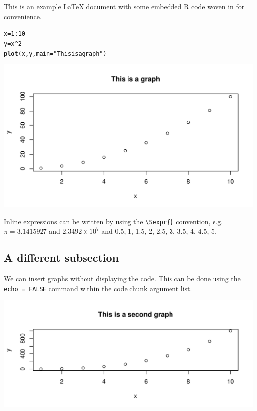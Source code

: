\documentclass{article}\usepackage[]{graphicx}\usepackage[]{xcolor}
\makeatletter
\def\maxwidth{ %
  \ifdim\Gin@nat@width>\linewidth
    \linewidth
  \else
    \Gin@nat@width
  \fi
}
\newcommand{\hlnum}[1]{\textcolor[rgb]{0.686,0.059,0.569}{#1}}%
\newcommand{\hlstr}[1]{\textcolor[rgb]{0.192,0.494,0.8}{#1}}%
\newcommand{\hlopt}[1]{\textcolor[rgb]{0,0,0}{#1}}%
\newcommand{\hlstd}[1]{\textcolor[rgb]{0.345,0.345,0.345}{#1}}%
\newcommand{\hlkwb}[1]{\textcolor[rgb]{0.69,0.353,0.396}{#1}}%
\newcommand{\hlkwc}[1]{\textcolor[rgb]{0.333,0.667,0.333}{#1}}%
\newcommand{\hlkwd}[1]{\textcolor[rgb]{0.737,0.353,0.396}{\textbf{#1}}}%
\newenvironment{kframe}{%
 \def\at@end@of@kframe{}%
 \ifinner\ifhmode%
  \def\at@end@of@kframe{\end{minipage}}%
  \begin{minipage}{\columnwidth}%
 \fi\fi%
 \def\FrameCommand##1{\hskip\@totalleftmargin \hskip-\fboxsep
 \colorbox{shadecolor}{##1}\hskip-\fboxsep
     \hskip-\linewidth \hskip-\@totalleftmargin \hskip\columnwidth}%
 \MakeFramed {\advance\hsize-\width
   \@totalleftmargin\z@ \linewidth\hsize
   \@setminipage}}%
 {\par\unskip\endMakeFramed%
 \at@end@of@kframe}
\newenvironment{knitrout}{}{} %
\makeatother
\begin{document}
This is an example LaTeX document with some embedded R code woven in for convenience.

\begin{knitrout}
\color{fgcolor}\begin{kframe}
\begin{alltt}
\hlstd{x} \hlkwb{=} \hlnum{1}\hlopt{:}\hlnum{10}
\hlstd{y}  \hlkwb{=} \hlstd{x} \hlopt{^} \hlnum{2}
\hlkwd{plot}\hlstd{(x, y,} \hlkwc{main} \hlstd{=} \hlstr{"This is a graph"}\hlstd{)}
\end{alltt}
\end{kframe}
\includegraphics[width=\maxwidth]{figure/foo-1} 
\end{knitrout}

Inline expressions can be written by using the
\verb|\Sexpr{}| convention, e.g. $\pi=3.1415927$
and \ensuremath{2.3492\times 10^{7}} and 0.5, 1, 1.5, 2, 2.5, 3, 3.5, 4, 4.5, 5.

\subsection*{A different subsection}
We can insert graphs without displaying the code.
This can be done using the \texttt{echo = FALSE}
command within the code chunk argument list.

\begin{knitrout}
\color{fgcolor}
\includegraphics[width=\maxwidth]{figure/foo2-1} 
\end{knitrout}
\end{document}
